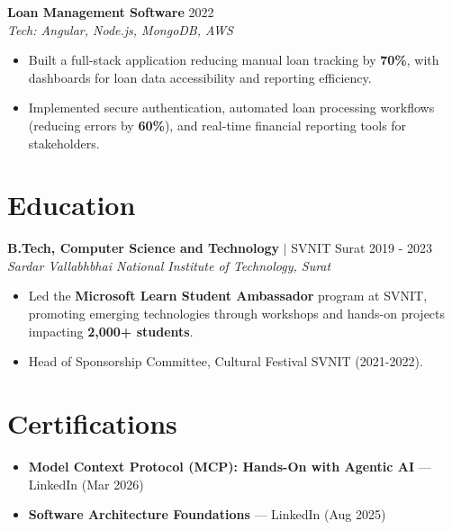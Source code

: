 \documentclass[letterpaper,10pt]{article}
\newcommand{\projectheader}[3]{%
  \noindent\textbf{#1} \hfill #2 \\
  \textit{\small Tech: #3}\vspace{-2pt}
}
\begin{document}
\projectheader{Loan Management Software}{2022}{Angular, Node.js, MongoDB, AWS}
\begin{itemize}
  \item Built a full-stack application reducing manual loan tracking by \textbf{70\%}, with dashboards for loan data accessibility and reporting efficiency.
  \item Implemented secure authentication, automated loan processing workflows (reducing errors by \textbf{60\%}), and real-time financial reporting tools for stakeholders.
\end{itemize}

\section{Education}
\noindent\textbf{B.Tech, Computer Science and Technology} $\vert$ SVNIT Surat \hfill 2019 - 2023 \\
\textit{\small Sardar Vallabhbhai National Institute of Technology, Surat}
\begin{itemize}
  \item Led the \textbf{Microsoft Learn Student Ambassador} program at SVNIT, promoting emerging technologies through workshops and hands-on projects impacting \textbf{2,000+ students}.
  \item Head of Sponsorship Committee, Cultural Festival SVNIT (2021-2022).
\end{itemize}

\section{Certifications}
\begin{itemize}
  \item \textbf{Model Context Protocol (MCP): Hands-On with Agentic AI} --- LinkedIn (Mar 2026)
  \item \textbf{Software Architecture Foundations} --- LinkedIn (Aug 2025)
\end{itemize}
\end{document}
